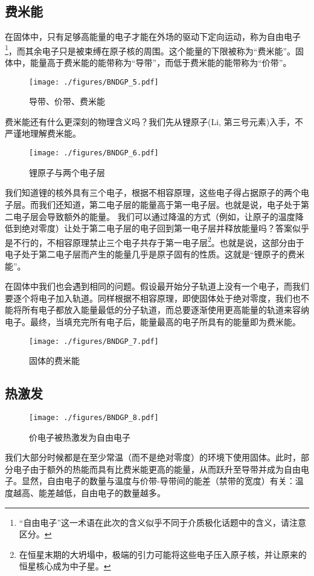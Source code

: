\subsection{费米能}
在固体中，只有足够高能量的电子才能在外场的驱动下定向运动，称为自由电子\footnote{“自由电子”这一术语在此次的含义似乎不同于介质极化话题中的含义，请注意区分。}，而其余电子只是被束缚在原子核的周围。这个能量的下限被称为“费米能”。固体中，能量高于费米能的能带称为“导带”，而低于费米能的能带称为“价带”。
\begin{figure}[ht]
\centering
\texttt{[image: ./figures/BNDGP\_5.pdf]}
\caption{导带、价带、费米能} \label{BNDGP_fig5}
\end{figure}

费米能还有什么更深刻的物理含义吗？我们先从锂原子(Li, 第三号元素)入手，不严谨地理解费米能。
\begin{figure}[ht]
\centering
\texttt{[image: ./figures/BNDGP\_6.pdf]}
\caption{锂原子与两个电子层} \label{BNDGP_fig6}
\end{figure}
我们知道锂的核外具有三个电子，根据不相容原理，这些电子得占据原子的两个电子层。而我们还知道，第二电子层的能量高于第一电子层。也就是说，电子处于第二电子层会导致额外的能量。
我们可以通过降温的方式（例如，让原子的温度降低到绝对零度）让处于第二电子层的电子回到第一电子层并释放能量吗？答案似乎是不行的，不相容原理禁止三个电子共存于第一电子层\footnote{在恒星末期的大坍塌中，极端的引力可能将这些电子压入原子核，并让原来的恒星核心成为中子星。}。也就是说，这部分由于电子处于第二电子层而产生的能量几乎是原子固有的性质。这就是“锂原子的费米能”。

在固体中我们也会遇到相同的问题。假设最开始分子轨道上没有一个电子，而我们要逐个将电子加入轨道。同样根据不相容原理，即使固体处于绝对零度，我们也不能将所有电子都放入能量最低的分子轨道，而总要逐渐使用更高能量的轨道来容纳电子。最终，当填充完所有电子后，能量最高的电子所具有的能量即为费米能。
\begin{figure}[ht]
\centering
\texttt{[image: ./figures/BNDGP\_7.pdf]}
\caption{固体的费米能} \label{BNDGP_fig7}
\end{figure}

\subsection{热激发}
\begin{figure}[ht]
\centering
\texttt{[image: ./figures/BNDGP\_8.pdf]}
\caption{价电子被热激发为自由电子} \label{BNDGP_fig8}
\end{figure}
我们大部分时候都是在至少常温（而不是绝对零度）的环境下使用固体。此时，部分电子由于额外的热能而具有比费米能更高的能量，从而跃升至导带并成为自由电子。显然，自由电子的数量与温度与价带-导带间的能差（禁带的宽度）有关：温度越高、能差越低，自由电子的数量越多。

